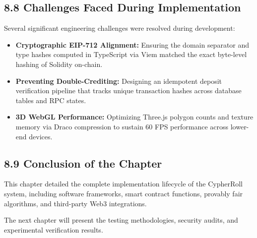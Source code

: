 \subsection*{8.8 Challenges Faced During Implementation}
Several significant engineering challenges were resolved during development:
\begin{itemize}[leftmargin=1.5em]
    \item \textbf{Cryptographic EIP-712 Alignment:} Ensuring the domain separator and type hashes computed in TypeScript via Viem matched the exact byte-level hashing of Solidity on-chain.
    \item \textbf{Preventing Double-Crediting:} Designing an idempotent deposit verification pipeline that tracks unique transaction hashes across database tables and RPC states.
    \item \textbf{3D WebGL Performance:} Optimizing Three.js polygon counts and texture memory via Draco compression to sustain 60 FPS performance across lower-end devices.
\end{itemize}

\subsection*{8.9 Conclusion of the Chapter}
This chapter detailed the complete implementation lifecycle of the CypherRoll system, including software frameworks, smart contract functions, provably fair algorithms, and third-party Web3 integrations.

The next chapter will present the testing methodologies, security audits, and experimental verification results.
\label{chap:implementation_end}
